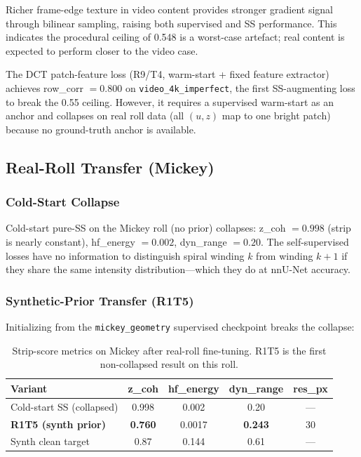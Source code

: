 \documentclass[11pt,a4paper]{article}
\begin{document}
Richer frame-edge texture in video content provides stronger gradient signal through bilinear sampling, raising both supervised and SS performance. This indicates the procedural ceiling of 0.548 is a worst-case artefact; real content is expected to perform closer to the video case.

The DCT patch-feature loss (R9/T4, warm-start + fixed feature extractor) achieves row\_corr $= 0.800$ on \texttt{video\_4k\_imperfect}, the first SS-augmenting loss to break the 0.55 ceiling. However, it requires a supervised warm-start as an anchor and collapses on real roll data (all $(u,z)$ map to one bright patch) because no ground-truth anchor is available.

\subsection{Real-Roll Transfer (Mickey)}

\subsubsection{Cold-Start Collapse}

Cold-start pure-SS on the Mickey roll (no prior) collapses: z\_coh $= 0.998$ (strip is nearly constant), hf\_energy $= 0.002$, dyn\_range $= 0.20$. The self-supervised losses have no information to distinguish spiral winding $k$ from winding $k+1$ if they share the same intensity distribution—which they do at nnU-Net accuracy.

\subsubsection{Synthetic-Prior Transfer (R1T5)}

Initializing from the \texttt{mickey\_geometry} supervised checkpoint breaks the collapse:

\begin{table}[H]
\centering
\begin{tabular}{lcccc}
\toprule
Variant & z\_coh & hf\_energy & dyn\_range & res\_px \\
\midrule
Cold-start SS (collapsed) & 0.998 & 0.002 & 0.20 & --- \\
\textbf{R1T5 (synth prior)} & \textbf{0.760} & 0.0017 & \textbf{0.243} & 30 \\
Synth clean target & 0.87 & 0.144 & 0.61 & --- \\
\bottomrule
\end{tabular}
\caption{Strip-score metrics on Mickey after real-roll fine-tuning. R1T5 is the first non-collapsed result on this roll.}
\label{tab:real_results}
\end{table}
\end{document}
